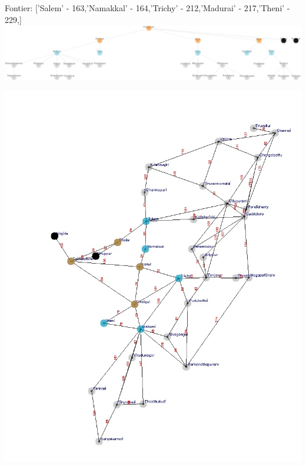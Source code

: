 \documentclass[xcolor=table]{beamer}
\begin{document}
\begin{frame}
  { \tiny Fontier: ['Salem' - 163,'Namakkal' - 164,'Trichy' - 212,'Madurai' - 217,'Theni' - 229,] }
  \includegraphics[width=1\textwidth]{../UCSNodes/10-1.png}
  \begin{center}
    \includegraphics[height=0.6\textheight]{../UCSoutput/tamilUCS8.jpg}
  \end{center}
\end{frame}
\end{document}

